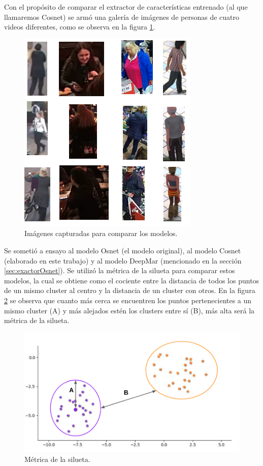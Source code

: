 Con el propósito de comparar el extractor de características entrenado (al que llamaremos Cosnet) se armó una galería de imágenes de personas de cuatro videos diferentes, como se observa en la figura \ref{fig:galerias}.

\begin{figure}[ht]
	\centering
	\includegraphics[scale=0.9]{./Figures/galerias.png}
	\caption{Imágenes capturadas para comparar los modelos.}
	\label{fig:galerias}
\end{figure}

Se sometió a ensayo al modelo Osnet (el modelo original), al modelo Cosnet (elaborado en este trabajo) y al modelo DeepMar (mencionado en la sección \ref{sec:exactorOsnet}). Se utilizó la métrica de la silueta \citep{METRICA_SILUETA} para comparar estos modelos, la cual se obtiene como el cociente entre la distancia de todos los puntos de un mismo cluster al centro y la distancia de un cluster con otros. En la figura \ref{fig:metricaSilueta} se observa que cuanto más cerca se encuentren los puntos pertenecientes a un mismo cluster (A) y más alejados estén los clusters entre sí (B), más alta será la métrica de la silueta.

\begin{figure}[ht]
	\centering
	\includegraphics[scale=.5]{./Figures/metricaSilueta.png}
	\caption{Métrica de la silueta.}
	\label{fig:metricaSilueta}
\end{figure}


